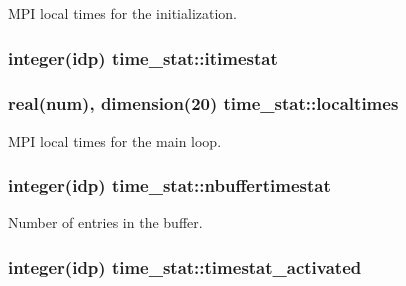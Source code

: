 M\+PI local times for the initialization. 

\subsubsection[{\texorpdfstring{itimestat}{itimestat}}]{\setlength{\rightskip}{0pt plus 5cm}integer(idp) time\+\_\+stat\+::itimestat}\hypertarget{namespacetime__stat_ae56826ec9ad1786db72cebc001ac6c8b}{}\label{namespacetime__stat_ae56826ec9ad1786db72cebc001ac6c8b}
\subsubsection[{\texorpdfstring{localtimes}{localtimes}}]{\setlength{\rightskip}{0pt plus 5cm}real(num), dimension(20) time\+\_\+stat\+::localtimes}\hypertarget{namespacetime__stat_a886a71aaf720ea3a044d9f0bcaf97eca}{}\label{namespacetime__stat_a886a71aaf720ea3a044d9f0bcaf97eca}


M\+PI local times for the main loop. 

\subsubsection[{\texorpdfstring{nbuffertimestat}{nbuffertimestat}}]{\setlength{\rightskip}{0pt plus 5cm}integer(idp) time\+\_\+stat\+::nbuffertimestat}\hypertarget{namespacetime__stat_a59f96deeaa99d052a09d3f13fd832018}{}\label{namespacetime__stat_a59f96deeaa99d052a09d3f13fd832018}


Number of entries in the buffer. 

\subsubsection[{\texorpdfstring{timestat\+\_\+activated}{timestat_activated}}]{\setlength{\rightskip}{0pt plus 5cm}integer(idp) time\+\_\+stat\+::timestat\+\_\+activated}\hypertarget{namespacetime__stat_a1945506276b001ce513b77a643537925}{}\label{namespacetime__stat_a1945506276b001ce513b77a643537925}


